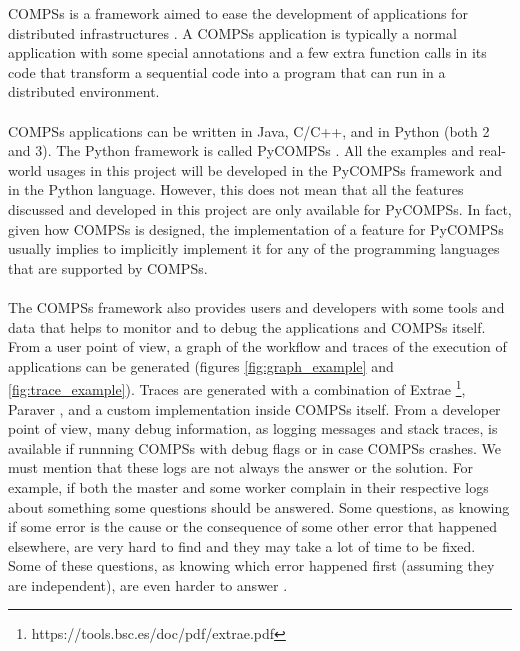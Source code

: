 \label{sec:compss}
COMPSs is a framework aimed to ease the development of applications for distributed infrastructures \cite{compss} \cite{Lordan2014}. A COMPSs application is typically a normal application with some special annotations and a few extra function calls in its code that transform a sequential code into a program that can run in a distributed environment.\\
\\
COMPSs applications can be written in Java, C/C++, and in Python (both 2 and 3). The Python framework is called PyCOMPSs \cite{pycompss}. All the examples and real-world usages in this project will be developed in the PyCOMPSs framework and in the Python language. However, this does not mean that all the features discussed and developed in this project are only available for PyCOMPSs. In fact, given how COMPSs is designed, the implementation of a feature for PyCOMPSs usually implies to implicitly implement it for any of the programming languages that are supported by COMPSs.\\
\\
The COMPSs framework also provides users and developers with some tools and data that helps to monitor and to debug the applications and COMPSs itself. From a user point of view, a graph of the workflow and traces of the execution of applications can be generated (figures \ref{fig:graph_example}  and \ref{fig:trace_example}). Traces are generated with a combination of Extrae \footnote{https://tools.bsc.es/doc/pdf/extrae.pdf}, Paraver \cite{paraver}, and a custom implementation inside COMPSs itself. From a developer point of view, many debug information, as logging messages and stack traces, is available if runnning COMPSs with debug flags or in case COMPSs crashes. We must mention that these logs are not always the answer or the solution. For example, if both the master and some worker complain in their respective logs about something some questions should be answered. Some questions, as knowing if some error is the cause or the consequence of some other error that happened elsewhere, are very hard to find and they may take a lot of time to be fixed.  Some of these questions, as knowing which error happened first (assuming they are independent), are even harder to answer \cite{Lamport}. 

